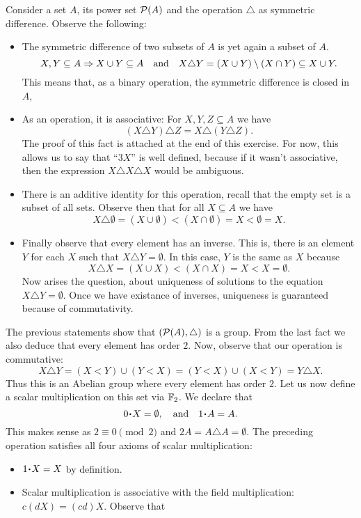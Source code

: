 \documentclass[12pt]{memoir}
\begin{document}
\begin{ptcbr}
Consider a set $A$, its power set $\mathcal{P}(A)$ and the operation $\triangle$ as symmetric difference. Observe the following:
\begin{itemize}
    \item The symmetric difference of two subsets of $A$ is yet again a subset of $A$.
    $$X,Y\subseteq A\Rightarrow X\cup Y\subseteq A\quad\text{and}\quad X\triangle Y=(X\cup Y)\setminus(X\cap Y)\subseteq X\cup Y.$$
    This means that, as a binary operation, the symmetric difference is closed in $A$,
    \item As an operation, it is associative: For $X,Y,Z\subseteq A$ we have
    $$(X\triangle Y)\triangle Z=X\triangle(Y\triangle Z).$$
    The proof of this fact is attached at the end of this exercise. For now, this allows us to say that ``$3X$'' is well defined, because if it wasn't associative, then the expression $X\triangle X\triangle X$ would be ambiguous.
    \item There is an additive identity for this operation, recall that the empty set is a subset of all sets. Observe then that for all $X\subseteq A$ we have
    $$X\triangle \emptyset= (X\cup \emptyset)\less(X\cap \emptyset)=X\less \emptyset=X.$$
    \item Finally observe that every element has an inverse. This is, there is an element $Y$ for each $X$ such that $X\triangle Y=\emptyset$. In this case, $Y$ is the same as $X$ because 
    $$X\triangle X=(X\cup X)\less(X\cap X)=X\less X=\emptyset.$$
    Now arises the question, about uniqueness of solutions to the equation $X\triangle Y=\emptyset$. Once we have existance of inverses, uniqueness is guaranteed because of commutativity.
\end{itemize}
The previous statements show that $(\mathcal{P}(A),\triangle)$ is a group. From the last fact we also deduce that every element has order $2$. Now, observe that our operation is commutative:
$$X\triangle Y=(X\less Y)\cup (Y\less X)=(Y\less X)\cup(X\less Y)=Y\triangle X.$$
Thus this is an Abelian group where every element has order $2$. Let us now define a scalar multiplication on this set via $\mathbb{F}_2$. We declare that 
$$0\.X=\emptyset,\word{and}1\.A=A.$$
This makes sense as $2\equiv 0\pmod 2$ and $2A=A\triangle A=\emptyset$. The preceding operation satisfies all four axioms of scalar multiplication:
\begin{itemize}
    \item $1\.X=X$ by definition.
    \item Scalar multiplication is associative with the field multiplication: $c(dX)=(cd)X$. Observe that 

\end{itemize}
\end{ptcbr}
\end{document}
